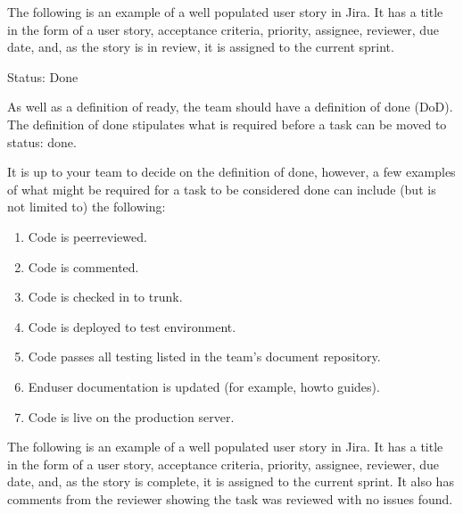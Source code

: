 \documentclass[letterpaper,10pt,english]{jupyterBook}
\begin{document}
\sphinxAtStartPar
The following is an example of a well populated user story in Jira. It
has a title in the form of a user story, acceptance criteria, priority,
assignee, reviewer, due date, and, as the story is in review, it is
assigned to the current sprint.

\sphinxAtStartPar
{}

\sphinxAtStartPar
Status: Done

\sphinxAtStartPar
As well as a definition of ready, the team should have a definition of
done (DoD). The definition of done stipulates what is required before a
task can be moved to status: done.

\sphinxAtStartPar
It is up to your team to decide on the definition of done, however, a
few examples of what might be required for a task to be considered done
can include (but is not limited to) the following:
\begin{enumerate}
%
\item {} 
\sphinxAtStartPar
Code is peer\sphinxhyphen{}reviewed.

\item {} 
\sphinxAtStartPar
Code is commented.

\item {} 
\sphinxAtStartPar
Code is checked in to trunk.

\item {} 
\sphinxAtStartPar
Code is deployed to test environment.

\item {} 
\sphinxAtStartPar
Code passes all testing listed in the team’s document repository.

\item {} 
\sphinxAtStartPar
End\sphinxhyphen{}user documentation is updated (for example, how\sphinxhyphen{}to guides).

\item {} 
\sphinxAtStartPar
Code is live on the production server.

\end{enumerate}

\sphinxAtStartPar
The following is an example of a well populated user story in Jira. It
has a title in the form of a user story, acceptance criteria, priority,
assignee, reviewer, due date, and, as the story is complete, it is
assigned to the current sprint. It also has comments from the reviewer
showing the task was reviewed with no issues found.
\end{document}
